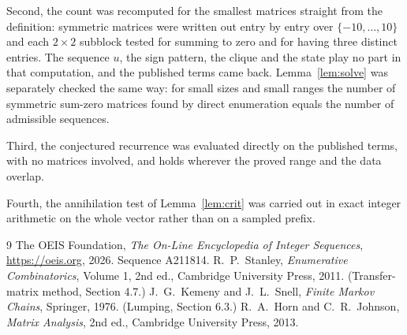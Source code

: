 \documentclass[11pt,a4paper]{article}
\theoremstyle{plain}
\theoremstyle{definition}
\begin{document}
Second, the count was recomputed for the smallest matrices straight from the definition:
symmetric matrices were written out entry by entry over $\{-10,\dots,10\}$ and each
$2\times2$ subblock tested for summing to zero and for having three distinct entries. The
sequence $u$, the sign pattern, the clique and the state play no part in that computation, and
the published terms came back. Lemma~\ref{lem:solve} was separately checked the same way: for
small sizes and small ranges the number of symmetric sum-zero matrices found by direct
enumeration equals the number of admissible sequences.

Third, the conjectured recurrence was evaluated directly on the published terms, with no
matrices involved, and holds wherever the proved range and the data overlap.

Fourth, the annihilation test of Lemma~\ref{lem:crit} was carried out in exact integer
arithmetic on the whole vector rather than on a sampled prefix.

\begin{thebibliography}{9}
 The OEIS Foundation, \emph{The On-Line Encyclopedia of Integer
Sequences}, \url{https://oeis.org}, 2026. Sequence A211814.
 R.~P.~Stanley, \emph{Enumerative Combinatorics}, Volume 1, 2nd ed.,
Cambridge University Press, 2011. (Transfer-matrix method, Section 4.7.)
 J.~G.~Kemeny and J.~L.~Snell, \emph{Finite Markov Chains}, Springer, 1976.
(Lumping, Section 6.3.)
 R.~A.~Horn and C.~R.~Johnson, \emph{Matrix Analysis}, 2nd ed., Cambridge
University Press, 2013.
\end{thebibliography}
\end{document}
